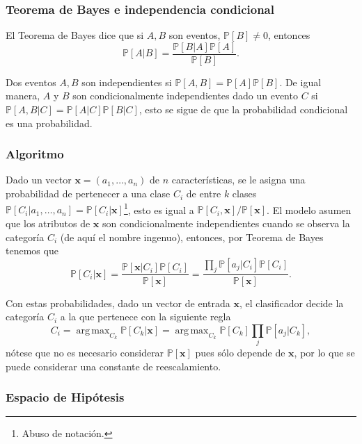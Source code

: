 \documentclass[spanish,11pt,letterpaper]{article}
\renewcommand{\vec}[1]{\mathbf{#1}}
\DeclareMathOperator*{\argmax}{arg\,max}
\begin{document}
\subsubsection{Teorema de Bayes e independencia condicional}

El Teorema de Bayes dice que si $A,B$ son eventos, $\mathbb{P}[B] \neq 0$,
entonces \[ \mathbb{P}[A|B] = \frac{\mathbb{P}[B|A]\mathbb{P}[A]}{\mathbb{P}[B]}. \]

Dos eventos $A,B$ son independientes si $\mathbb{P}[A,B] = \mathbb{P}[A]\mathbb{P}[B]$.
De igual manera, $A$ y $B$ son condicionalmente independientes dado un evento $C$
si $\mathbb{P}[A,B|C] = \mathbb{P}[A|C]\mathbb{P}[B|C]$, esto se sigue de que la
probabilidad condicional es una probabilidad.

\subsubsection{Algoritmo}

Dado un vector $\vec{x} = (a_1,\ldots,a_n)$ de $n$ características, se le asigna
una probabilidad de pertenecer a una clase $C_i$ de entre $k$ clases
$\mathbb{P}[C_i|a_1,\ldots,a_n] = \mathbb{P}[C_i|\vec{x}]$\footnote{Abuso de notación.},
esto es igual a $\mathbb{P}[C_i,\vec{x}]/\mathbb{P}[\vec{x}]$.
El modelo asumen que los atributos de $\vec{x}$ son condicionalmente independientes
cuando se observa la categoría $C_i$ (de aquí el nombre ingenuo), entonces,
por Teorema de Bayes tenemos que
\begin{equation}
\mathbb{P}[C_i|\vec{x}] = \frac{\mathbb{P}[\vec{x}|C_i]\mathbb{P}[C_i]}{\mathbb{P}[\vec{x}]}
= \frac{\prod_j \mathbb{P}[a_j|C_i]\mathbb{P}[C_i]}{\mathbb{P}[\vec{x}]}.
\end{equation}

Con estas probabilidades, dado un vector de entrada $\vec{x}$, el clasificador
decide la categoría $C_i$ a la que pertenece con la siguiente regla
\[ C_i = \argmax_{C_k} \mathbb{P}[C_k|\vec{x}] = \argmax_{C_k} \mathbb{P}[C_k]\prod_j \mathbb{P}[a_j|C_k], \]
nótese que no es necesario considerar $\mathbb{P}[\vec{x}]$ pues sólo depende
de $\vec{x}$, por lo que se puede considerar una constante de reescalamiento.

\subsubsection{Espacio de Hipótesis}
\end{document}
